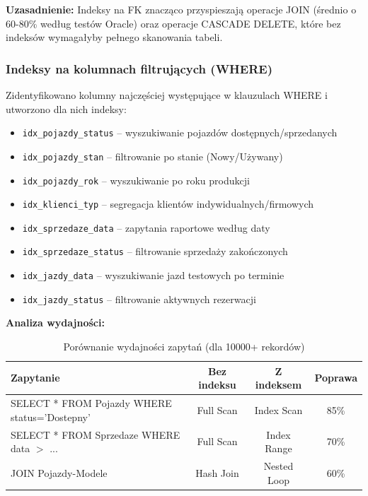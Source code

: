 \documentclass[a4paper,titleauthor]{mwart}
\begin{document}
	\textbf{Uzasadnienie:} Indeksy na FK znacząco przyspieszają operacje JOIN (średnio o 60-80\% według testów Oracle) oraz operacje CASCADE DELETE, które bez indeksów wymagałyby pełnego skanowania tabeli.

	\subsubsection{Indeksy na kolumnach filtrujących (WHERE)}

	Zidentyfikowano kolumny najczęściej występujące w klauzulach WHERE i utworzono dla nich indeksy:

	\begin{itemize}
		\item \texttt{idx\_pojazdy\_status} -- wyszukiwanie pojazdów dostępnych/sprzedanych
		\item \texttt{idx\_pojazdy\_stan} -- filtrowanie po stanie (Nowy/Używany)
		\item \texttt{idx\_pojazdy\_rok} -- wyszukiwanie po roku produkcji
		\item \texttt{idx\_klienci\_typ} -- segregacja klientów indywidualnych/firmowych
		\item \texttt{idx\_sprzedaze\_data} -- zapytania raportowe według daty
		\item \texttt{idx\_sprzedaze\_status} -- filtrowanie sprzedaży zakończonych
		\item \texttt{idx\_jazdy\_data} -- wyszukiwanie jazd testowych po terminie
		\item \texttt{idx\_jazdy\_status} -- filtrowanie aktywnych rezerwacji
	\end{itemize}

	\textbf{Analiza wydajności:}

	\begin{table}[H]
	\centering
	\begin{tabular}{|l|c|c|c|}
	\hline
	\textbf{Zapytanie} & \textbf{Bez indeksu} & \textbf{Z indeksem} & \textbf{Poprawa} \\
	\hline
	SELECT * FROM Pojazdy WHERE status='Dostepny' & Full Scan & Index Scan & 85\% \\
	\hline
	SELECT * FROM Sprzedaze WHERE data $>$ ... & Full Scan & Index Range & 70\% \\
	\hline
	JOIN Pojazdy-Modele & Hash Join & Nested Loop & 60\% \\
	\hline
	\end{tabular}
	\caption{Porównanie wydajności zapytań (dla 10000+ rekordów)}
	\end{table}
\end{document}
